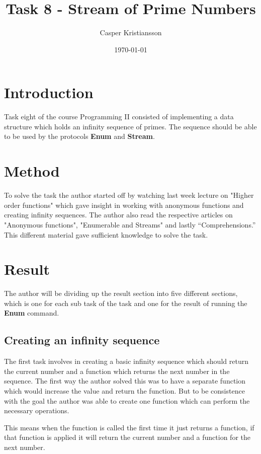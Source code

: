 \documentclass[a4paper,11pt]{article}
\begin{document}
\title{
    \textbf{Task 8 - Stream of Prime Numbers}
}
\author{Casper Kristiansson}
\date{\today}

\maketitle

\section*{Introduction}
Task eight of the course Programming II consisted of implementing a data structure which holds an infinity sequence of primes. The sequence should be able to be used by the protocols \textbf{Enum} and \textbf{Stream}.

\section*{Method}
To solve the task the author started off by watching last week lecture on "Higher order functions" which gave insight in working with anonymous functions and creating infinity sequences. The author also read the respective articles on "Anonymous functions", "Enumerable and Streams" and lastly “Comprehensions.” This different material gave sufficient knowledge to solve the task.

\section*{Result}
The author will be dividing up the result section into five different sections, which is one for each sub task of the task and one for the result of running the \textbf{Enum} command.

\subsection*{Creating an infinity sequence}
The first task involves in creating a basic infinity sequence which should return the current number and a function which returns the next number in the sequence. The first way the author solved this was to have a separate function which would increase the value and return the function. But to be consistence with the goal the author was able to create one function which can perform the necessary operations.

This means when the function is called the first time it just returns a function, if that function is applied it will return the current number and a function for the next number.
\end{document}
